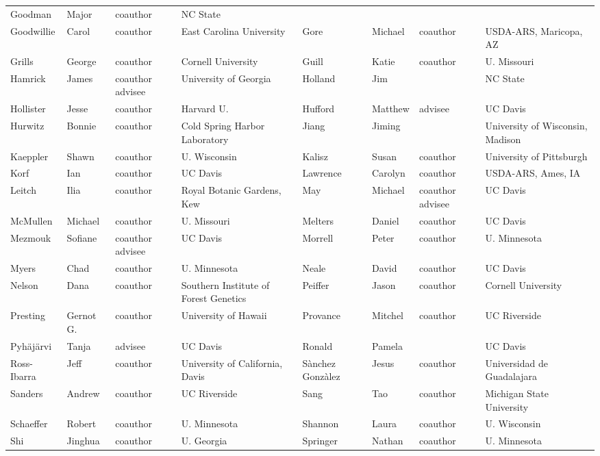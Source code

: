 \documentclass[11pt]{article}
\begin{document}
\begin{tiny}
\begin{tabular}{ l l l l l l l l }
Goodman & Major & coauthor   & NC State \\ 
Goodwillie & Carol & coauthor   & East Carolina University &
Gore & Michael & coauthor   & USDA-ARS, Maricopa, AZ \\ 
Grills & George & coauthor   & Cornell University &
Guill & Katie & coauthor   & U. Missouri \\ 
Hamrick &  James & coauthor  advisee & University of Georgia &
Holland & Jim &    & NC State \\ 
Hollister &  Jesse & coauthor   & Harvard U. &
Hufford & Matthew &  advisee & UC Davis \\ 
Hurwitz & Bonnie & coauthor   & Cold Spring Harbor Laboratory &
Jiang & Jiming &    & University of Wisconsin, Madison \\ 
Kaeppler & Shawn & coauthor   & U. Wisconsin &
Kalisz &  Susan & coauthor   & University of Pittsburgh \\ 
Korf & Ian & coauthor & UC Davis &
Lawrence & Carolyn & coauthor   & USDA-ARS, Ames, IA \\ 
Leitch &  Ilia & coauthor   & Royal Botanic Gardens, Kew &
May &  Michael & coauthor  advisee & UC Davis \\ 
McMullen & Michael & coauthor   & U. Missouri &
Melters & Daniel & coauthor & UC Davis \\ 
Mezmouk & Sofiane & coauthor  advisee & UC Davis &
Morrell &  Peter & coauthor   & U. Minnesota \\ 
Myers & Chad & coauthor   & U. Minnesota &
Neale & David & coauthor   & UC Davis \\ 
Nelson & Dana & coauthor   & Southern Institute of Forest Genetics &
Peiffer & Jason & coauthor   & Cornell University \\ 
Presting & Gernot G. & coauthor   & University of Hawaii & 
Provance &  Mitchel & coauthor   & UC Riverside \\ 
Pyh\"aj\"arvi  & Tanja &   advisee & UC Davis &
Ronald & Pamela &  & UC Davis \\ 
Ross-Ibarra & Jeff & coauthor   & University of California, Davis &
S\`anchez Gonz\`alez & Jesus & coauthor   & Universidad de Guadalajara \\ 
Sanders &  Andrew & coauthor   & UC Riverside &
Sang &  Tao & coauthor   & Michigan State University \\ 
Schaeffer & Robert & coauthor   & U. Minnesota &
Shannon & Laura & coauthor   & U. Wisconsin \\ 
Shi & Jinghua & coauthor   & U. Georgia &
Springer & Nathan & coauthor   & U. Minnesota \\ 

\end{tabular}
\end{tiny}
\end{document}
